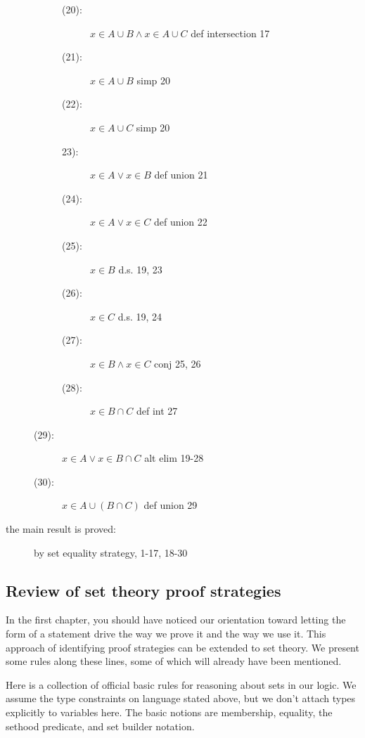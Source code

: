 \documentclass[12pt]{book}
\begin{document}
\begin{description}
\begin{description}
\begin{description}
\item[(20):]   $x \in A \cup B \wedge x \in A \cup C$  def intersection 17

\item[(21):]  $x \in A \cup B$ simp 20

\item[(22):]  $x \in A \cup C$  simp 20

\item[23):]  $x \in A \vee x \in B$  def union 21

\item[(24):]  $x \in A \vee x \in C$ def union 22

\item[(25):]  $x \in B$  d.s. 19, 23

\item[(26):]  $x \in C$  d.s. 19, 24

\item [(27):]  $x \in B \wedge x \in C$  conj 25, 26

\item[(28):]  $x \in B \cap C$  def int 27

\end{description}

\item[(29):]  $x \in A \vee x \in B \cap C$  alt elim 19-28

\item[(30):]  $x \in A \cup (B \cap C)$  def union 29

\end{description}

\item[the main result is proved:]  by set equality strategy, 1-17, 18-30

\end{description}

\newpage

\subsection{Review of set theory proof strategies}

In the first chapter, you should have noticed our orientation toward letting the form of a statement drive the way we prove it and the way we use it.  This approach of identifying proof strategies can be extended to set theory.  We present some rules along these lines, some of which will already have been mentioned.

Here is a collection of official basic rules for reasoning about sets in our logic.  We assume the type constraints on language stated above, but we don't attach types explicitly to variables here.  The basic notions are membership, equality, the sethood predicate, and set builder notation.
\end{document}
